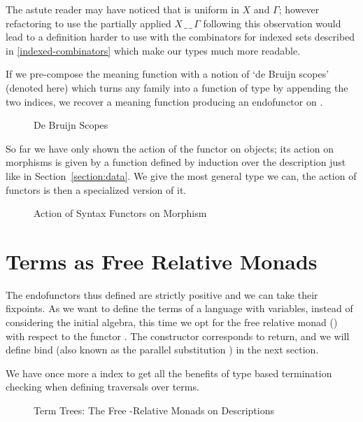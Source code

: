 The astute reader may have noticed that  is uniform in $X$ and $\Gamma$; however
refactoring  to use the partially applied $X\,\_\,\_\,\Gamma$ following
this observation would lead to a definition harder to use with the
combinators for indexed sets described in \cref{indexed-combinators}
which make our types much more readable.

If we pre-compose the meaning function  with a notion of `de Bruijn scopes'
(denoted  here) which turns any   family into a function
of type      by appending the two
 indices, we recover a meaning function producing an endofunctor on
 .

\begin{figure}[h]
\caption{De Bruijn Scopes}\label{figure:debruijnscope}
\end{figure}

So far we have only shown the action of the functor on objects; its action on
morphisms is given by a function  defined by induction over the
description just like in Section~\ref{section:data}. We give  the most
general type we can, the action of functors is then a specialized version of it.

\begin{figure}[h]
\caption{Action of Syntax Functors on Morphism\label{figure:descfmap}}
\end{figure}

\section{Terms as Free Relative Monads}

The endofunctors thus defined are strictly positive and we can take their fixpoints.
As we want to define the terms of a language with variables, instead of
considering the initial algebra, this time we opt for the free relative
monad (\cite{Altenkirch2010, JFR4389}) with respect to the functor .
The  constructor corresponds to return, and we will define bind (also
known as the parallel substitution ) in the next section.

We have once more a  index to get all the benefits of type based
termination checking when defining traversals over terms.

\begin{figure}[h]
\caption{Term Trees: The Free -Relative Monads on Descriptions\label{figure:freemonad}}
\end{figure}


